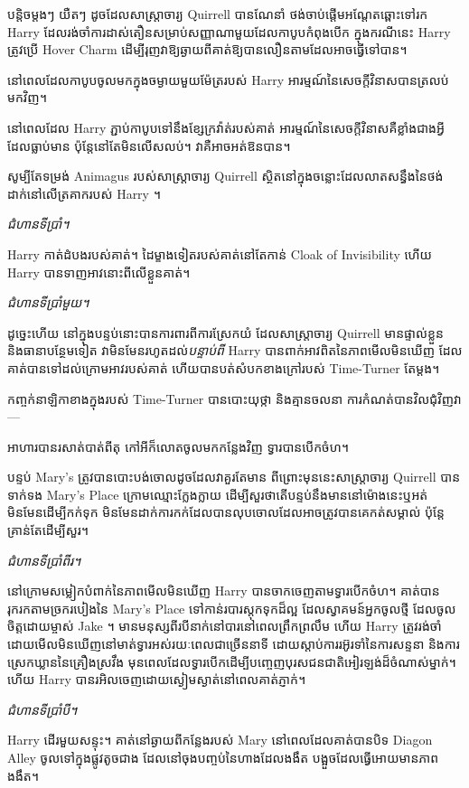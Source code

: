 {{បន្តិចម្តងៗ យឺតៗ ដូចដែលសាស្រ្តាចារ្យ Quirrell បានណែនាំ ថង់ចាប់ផ្តើមអណ្តែតឆ្ពោះទៅរក Harry ដែលរង់ចាំការដាស់តឿនសម្រាប់សញ្ញាណាមួយដែលកាបូបកំពុងបើក ក្នុងករណីនេះ Harry ត្រូវប្រើ Hover Charm ដើម្បីរុញវាឱ្យឆ្ងាយពីគាត់ឱ្យបានលឿនតាមដែលអាចធ្វើទៅបាន។

នៅពេលដែលកាបូបចូលមកក្នុងចម្ងាយមួយម៉ែត្ររបស់ Harry អារម្មណ៍នៃសេចក្តីវិនាសបានត្រលប់មកវិញ។

នៅពេលដែល Harry ភ្ជាប់កាបូបទៅនឹងខ្សែក្រវ៉ាត់របស់គាត់ អារម្មណ៍នៃសេចក្តីវិនាសគឺខ្លាំងជាងអ្វីដែលធ្លាប់មាន ប៉ុន្តែនៅតែមិនលើសលប់។ វាគឺអាចអត់ឱនបាន។

សូម្បីតែទម្រង់ Animagus របស់សាស្រ្តាចារ្យ Quirrell ស្ថិតនៅក្នុងចន្លោះដែលលាតសន្ធឹងនៃថង់ដាក់នៅលើត្រគាករបស់ Harry ។

\emph{ជំហានទីប្រាំ។}

Harry កាត់​ដំបង​របស់​គាត់។ ដៃម្ខាងទៀតរបស់គាត់នៅតែកាន់ Cloak of Invisibility ហើយ Harry បានទាញអាវនោះពីលើខ្លួនគាត់។

\emph{ជំហានទីប្រាំមួយ។}

ដូច្នេះហើយ នៅក្នុងបន្ទប់នោះបានការពារពីការស្រែកយំ ដែលសាស្រ្តាចារ្យ Quirrell មានផ្ទាល់ខ្លួន និងធានាបន្ថែមទៀត វាមិនមែនរហូតដល់\emph{បន្ទាប់ពី} Harry បានពាក់អាវពិតនៃភាពមើលមិនឃើញ ដែលគាត់បានទៅដល់ក្រោមអាវរបស់គាត់ ហើយបានបត់សំបកខាងក្រៅរបស់ Time-Turner តែម្តង។

កញ្ចក់នាឡិកាខាងក្នុងរបស់ Time-Turner បានបោះយុថ្កា និងគ្មានចលនា ការកំណត់បានវិលជុំវិញវា—

អាហារ​បាន​រសាត់​បាត់​ពី​តុ កៅអី​ក៏​លោត​ចូល​មក​កន្លែង​វិញ ទ្វារ​បាន​បើក​ចំហ។

បន្ទប់ Mary's ត្រូវបានបោះបង់ចោលដូចដែលវាគួរតែមាន ពីព្រោះមុននេះសាស្រ្តាចារ្យ Quirrell បានទាក់ទង Mary's Place ក្រោមឈ្មោះក្លែងក្លាយ ដើម្បីសួរថាតើបន្ទប់នឹងមាននៅម៉ោងនេះឬអត់ មិនមែនដើម្បីកក់ទុក មិនមែនដាក់ការកក់ដែលបានលុបចោលដែលអាចត្រូវបានគេកត់សម្គាល់ ប៉ុន្តែគ្រាន់តែដើម្បីសួរ។

\emph{ជំហានទីប្រាំពីរ។}

នៅក្រោមសម្លៀកបំពាក់នៃភាពមើលមិនឃើញ Harry បានចាកចេញតាមទ្វារបើកចំហ។ គាត់បានរុករកតាមច្រករបៀងនៃ Mary's Place ទៅកាន់របារស្តុកទុកដ៏ល្អ ដែលស្វាគមន៍អ្នកចូលថ្មី ដែលចូលចិត្តដោយម្ចាស់ Jake ។ មានមនុស្សពីរបីនាក់នៅបារនៅពេលព្រឹកព្រលឹម ហើយ Harry ត្រូវរង់ចាំដោយមើលមិនឃើញនៅមាត់ទ្វារអស់រយៈពេលជាច្រើននាទី ដោយស្តាប់ការរអ៊ូរទាំនៃការសន្ទនា និងការស្រេកឃ្លាននៃគ្រឿងស្រវឹង មុនពេលដែលទ្វារបើកដើម្បីបញ្ចេញបុរសជនជាតិអៀរឡង់ដ៏ចំណាស់ម្នាក់។ ហើយ Harry បានរអិលចេញដោយស្ងៀមស្ងាត់នៅពេលគាត់ភ្ញាក់។

\emph{ជំហានទីប្រាំបី។}

Harry ដើរមួយសន្ទុះ។ គាត់នៅឆ្ងាយពីកន្លែងរបស់ Mary នៅពេលដែលគាត់បានបិទ Diagon Alley ចូលទៅក្នុងផ្លូវតូចជាង ដែលនៅចុងបញ្ចប់នៃហាងដែលងងឹត បង្អួចដែលធ្វើអោយមានភាពងងឹត។

}}
